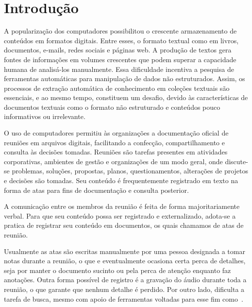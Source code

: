 \chapter{Introdução}\label{chap:introducao}



A popularização dos computadores possibilitou o crescente armazenamento de conteúdos em formatos digitais. Entre esses, o formato textual como em livros, documentos, e-mails, redes sociais e páginas web. A produção de textos gera fontes de informações em volumes crescentes que podem superar a capacidade humana de analisá-los manualmente. Essa dificuldade incentiva a pesquisa de ferramentas automáticas para manipulação de dados não estruturados. Assim, os processos de extração automática de conhecimento em coleções textuais são essenciais, e ao mesmo tempo, constituem um desafio, devido às características de documentos textuais como o formato não estruturado e conteúdos pouco informativos ou irrelevante.




O uso de computadores permitiu às organizações a documentação oficial de reuniões em arquivos digitais, facilitando a confecção, compartilhamento e consulta às decisões tomadas.
% 
% 
% 
% 
Reuniões são tarefas presentes em atividades corporativas, ambientes de gestão e organizações de um modo geral, onde discute-se problemas, soluções, propostas, planos, questionamentos, alterações de projetos e decisões são tomadas. Seu conteúdo é frequentemente registrado em texto na forma de atas para fins de documentação e consulta posterior. 

A comunicação entre os membros da reunião é feita de forma majoritariamente verbal. Para que seu conteúdo possa ser registrado e externalizado, adota-se a pratica de registrar seu conteúdo em documentos, os quais chamamos de atas de reunião. 

Usualmente as atas são escritas manualmente por uma pessoa designada a tomar notas durante a reunião, o que e eventualmente ocasiona certa perca de detalhes, seja por manter o documento sucinto ou pela perca de atenção enquanto faz anotações.  Outra forma possível de registro é a gravação do áudio durante toda a reunião, o que garante que nenhum detalhe é perdido. Por outro lado, dificulta a tarefa de busca, mesmo com apoio de ferramentas voltadas para esse fim como~\cite{Schiller2009}. 



